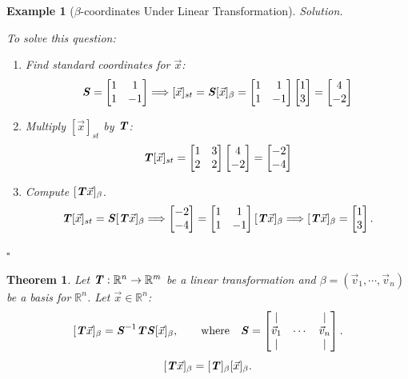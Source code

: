 \documentclass[12pt, a4paper]{article}
\newtheorem{thm}{Theorem}[subsection]
\newtheorem{eg}{Example}[subsection]
\newenvironment*{sol}{\indent\textit{Solution. }}{\hfill{$\square$}\par}
\def\R{{\mathbb{R}}}
\def\T{{\textbf{\emph{T}}}}
\def\vecx{\vec{x}}
\def\vecv{\vec{v}}
\def\matrixS{\textbf{\emph{S}}}
\begin{document}
\begin{eg}[$\beta$-coordinates Under Linear Transformation]
\begin{sol}
\begin{center}
		\end{center}
		To solve this question: 
		\begin{enumerate}
			\item Find standard coordinates for $\vecx$: 
				\[\matrixS=\begin{bmatrix}1&1\\1&-1\end{bmatrix}\Longrightarrow[\vecx]_{st}=\matrixS[\vecx]_\beta=\begin{bmatrix}1&1\\1&-1\end{bmatrix}\begin{bmatrix}1\\3\end{bmatrix}=\begin{bmatrix}4\\-2\end{bmatrix}\]
			\item Multiply $[\vecx]_{st}$ by $\T$: 
				\[\T[\vecx]_{st}=\begin{bmatrix}1 & 3\\2 & 2\end{bmatrix}\begin{bmatrix}4\\-2\end{bmatrix}=\begin{bmatrix}-2\\-4\end{bmatrix}\]
			\item Compute $[\T\vecx]_\beta$.
				\[\T[\vecx]_{st}=\matrixS[\T\vecx]_\beta\Longrightarrow\begin{bmatrix}-2\\-4\end{bmatrix}=\begin{bmatrix}1&1\\1&-1\end{bmatrix}[\T\vecx]_\beta\Longrightarrow[\T\vecx]_\beta=\begin{bmatrix}1\\3\end{bmatrix}.\]
		\end{enumerate}
	\end{sol}
\end{eg}
\begin{thm}
	Let $\T: \R^n\to\R^m$ be a linear transformation and $\beta=(\vecv_1,\cdots,\vecv_n)$ be a basis for $\R^n$. Let $\vecx\in\R^n$: \[[\T\vecx]_\beta=\matrixS^{-1}\T\matrixS[\vecx]_\beta,\qquad\text{where}\quad\matrixS=\begin{bmatrix}|&&|\\\vecv_1&\cdots&\vecv_n\\|&&|\end{bmatrix}.\] 	\[[\T\vecx]_\beta=[\T]_\beta[\vecx]_\beta.\]
\end{thm}
\end{document}
